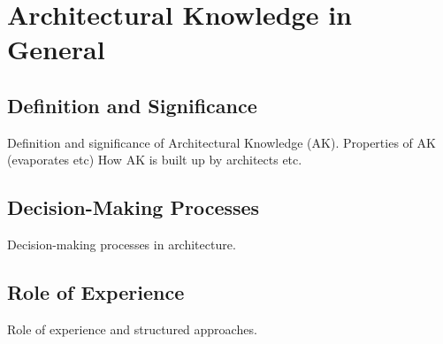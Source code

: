 \chapter{Architectural Knowledge in General}
    \section{Definition and Significance}
        Definition and significance of Architectural Knowledge (AK). Properties of AK (evaporates etc) How AK is built up by architects etc. 
    \section{Decision-Making Processes}
        Decision-making processes in architecture. 
    \section{Role of Experience}
        Role of experience and structured approaches.